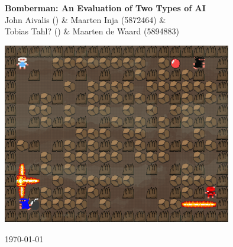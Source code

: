 

\begin{center}
\Huge \textbf{Bomberman: An Evaluation of Two Types of AI}\\
\vspace*{0.8cm}
\Large John Aivalis () \& Maarten Inja (5872464) \& \\ Tobias Tahl? () \& Maarten de Waard (5894883) 

\vspace*{4cm}

\includegraphics[width=10cm]{resources/bbman}

\vfill
\today

\end{center}
\thispagestyle{empty}
